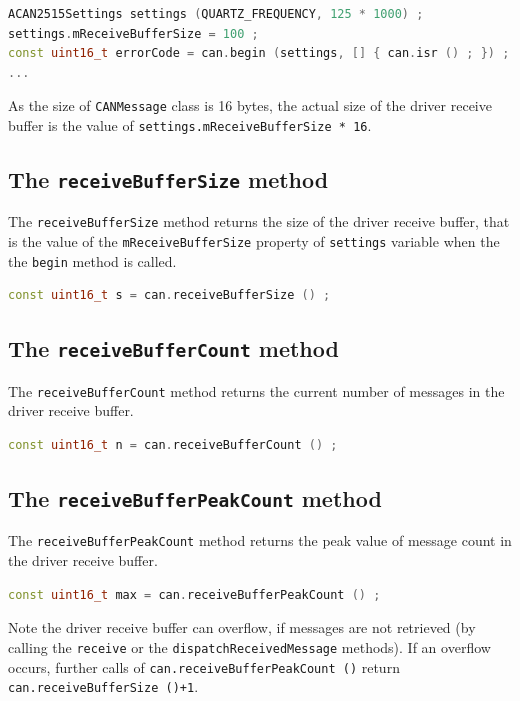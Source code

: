 \documentclass[10pt, a4paper, obeyspaces]{extarticle}
\begin{document}
{ \small\begin{lstlisting}[language=c++]
ACAN2515Settings settings (QUARTZ_FREQUENCY, 125 * 1000) ;
settings.mReceiveBufferSize = 100 ;
const uint16_t errorCode = can.begin (settings, [] { can.isr () ; }) ;
...
\end{lstlisting}}

As the size of \texttt{CANMessage} class is 16 bytes, the actual size of the driver receive buffer is the value of \texttt{settings.mReceiveBufferSize * 16}.


\subsection{The \texttt{receiveBufferSize} method}

The \texttt{receiveBufferSize} method returns the size of the driver receive buffer, that is the value of the \texttt{mReceiveBufferSize} property of \texttt{settings} variable when the the \texttt{begin} method is called.
{ \small\begin{lstlisting}[language=c++]
const uint16_t s = can.receiveBufferSize () ;
\end{lstlisting}}


\subsection{The \texttt{receiveBufferCount} method}

The \texttt{receiveBufferCount} method returns the current number of messages in the driver receive buffer.
{ \small\begin{lstlisting}[language=c++]
const uint16_t n = can.receiveBufferCount () ;
\end{lstlisting}}


\subsection{The \texttt{receiveBufferPeakCount} method}

The \texttt{receiveBufferPeakCount} method returns the peak value of message count in the driver receive buffer.
{ \small\begin{lstlisting}[language=c++]
const uint16_t max = can.receiveBufferPeakCount () ;
\end{lstlisting}}

Note the driver receive buffer can overflow, if messages are not retrieved (by calling the \texttt{receive} or the \texttt{dispatchReceivedMessage} methods). If an overflow occurs, further calls of \texttt{can.receiveBufferPeakCount ()} return \texttt{can.receiveBufferSize ()+1}.
\end{document}
